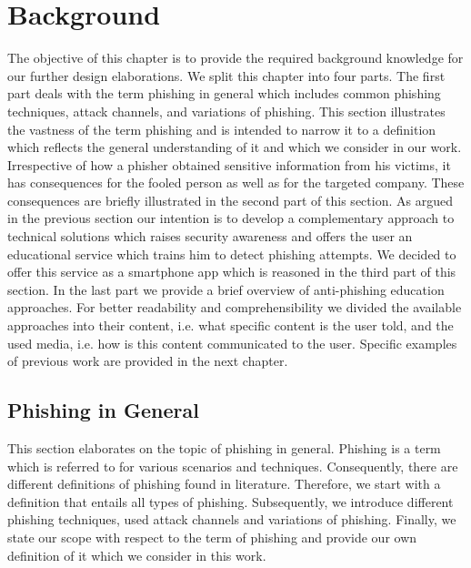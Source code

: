 \section{Background}
\label{s:background}
The objective of this chapter is to provide the required background knowledge for our further design elaborations. 
We split this chapter into four parts.
The first part deals with the term phishing in general which includes common phishing techniques, attack channels, and variations of phishing.
This section illustrates the vastness of the term phishing and is intended to narrow it to a definition which reflects the general understanding of it and which we consider in our work.
Irrespective of how a phisher obtained sensitive information from his victims, it has consequences for the fooled person as well as for the targeted company.
These consequences are briefly illustrated in the second part of this section.
As argued in the previous section our intention is to develop a complementary approach to technical solutions which raises security awareness and offers the user an educational service which trains him to detect phishing attempts.
We decided to offer this service as a smartphone app which is reasoned in the third part of this section.
In the last part we provide a brief overview of anti-phishing education approaches.
For better readability and comprehensibility we divided the available approaches into their content, i.e. what specific content is the user told, and the used media, i.e. how is this content communicated to the user. Specific examples of previous work are provided in the next chapter.

\subsection{Phishing in General}
\label{s:phishing_general}
This section elaborates on the topic of phishing in general.
Phishing is a term which is referred to for various scenarios and techniques.
Consequently, there are different definitions of phishing found in literature.
Therefore, we start with a definition that entails all types of phishing.
Subsequently, we introduce different phishing techniques, used attack channels and variations of phishing.
Finally, we state our scope with respect to the term of phishing and provide our own definition of it which we consider in this work.
